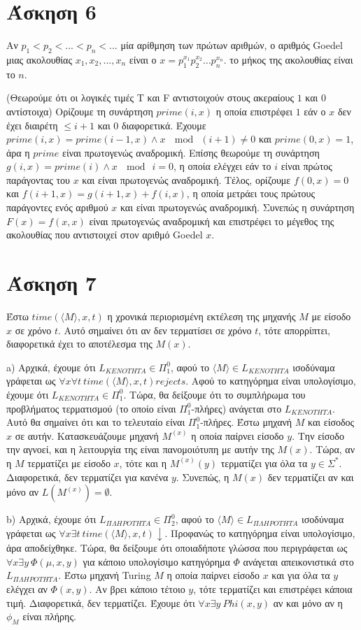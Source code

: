 \documentclass[a4paper, oneside, 11pt]{article}
\theoremstyle{definition}
\begin{document}
\section*{Άσκηση 6}
Αν $p_1<p_2<...<p_n<...$ μία αρίθμηση των πρώτων αριθμών, ο αριθμός Goedel μιας ακολουθίας $x_1,x_2,...,x_n$ είναι ο
$x = p_1^{x_1}p_2^{x_2}\dots p_n^{x_n}$. το μήκος της ακολουθίας είναι το $n$.

(Θεωρούμε ότι οι λογικές τιμές T και F αντιστοιχούν στους ακεραίους $1$ και $0$ αντίστοιχα)
Ορίζουμε τη συνάρτηση $prime(i,x)$ η οποία επιστρέφει $1$ εάν ο $x$ δεν έχει διαιρέτη $\leq i+1$ και $0$ διαφορετικά.
Έχουμε $prime(i,x)=prime(i-1,x)\land x\ \mod\ (i+1)\neq 0$ και $prime(0,x)=1$, άρα η $prime$ είναι πρωτογενώς αναδρομική.
Επίσης θεωρούμε τη συνάρτηση $g(i,x)=prime(i)\land x\ \mod\ i=0$, η οποία ελέγχει εάν το $i$ είναι πρώτος παράγοντας του $x$ και
είναι πρωτογενώς αναδρομική. Τέλος, ορίζουμε $f(0,x)=0$ και $f(i+1,x)=g(i+1,x) + f(i,x)$, η οποία μετράει τους πρώτους παράγοντες
ενός αριθμού $x$ και είναι πρωτογενώς αναδρομική. Συνεπώς η συνάρτηση $F(x)=f(x,x)$ είναι πρωτογενώς αναδρομική και επιστρέφει
το μέγεθος της ακολουθίας που αντιστοιχεί στον αριθμό Goedel $x$.

\section*{Άσκηση 7}
Έστω $time(\langle M\rangle, x, t)$ η χρονικά περιορισμένη εκτέλεση της μηχανής $M$ με είσοδο $x$ σε χρόνο $t$. Αυτό σημαίνει ότι αν δεν τερματίσει σε χρόνο $t$, τότε απορρίπτει,
διαφορετικά έχει το αποτέλεσμα της $M(x)$.

a) Αρχικά, έχουμε ότι $L_{KENOTHTA}\in \Pi_1^0$, αφού το $\langle M\rangle\in L_{KENOTHTA}$ ισοδύναμα γράφεται ως $\forall x\forall t\ time(\langle M\rangle,x,t) rejects$. 
Αφού το κατηγόρημα είναι υπολογίσιμο, έχουμε ότι $L_{KENOTHTA}\in \Pi_1^0$.
Τώρα, θα δείξουμε ότι το συμπλήρωμα του προβλήματος τερματισμού (το οποίο είναι $\Pi_1^0$-πλήρες) ανάγεται στο $L_{KENOTHTA}$. Αυτό θα σημαίνει ότι και το τελευταίο είναι 
$\Pi_1^0$-πλήρες. Έστω μηχανή $M$ και είσοδος $x$ σε αυτήν. Κατασκευάζουμε μηχανή $M^{(x)}$ η οποία παίρνει είσοδο $y$. Την είσοδο την αγνοεί, και η λειτουργία της είναι
πανομοιότυπη με αυτήν της $M(x)$. Τώρα, αν η $M$ τερματίζει με είσοδο $x$, 
τότε και η $M^{(x)}(y)$ τερματίζει για όλα τα $y\in\Sigma^*$. Διαφορετικά, δεν τερματίζει για κανένα $y$.
Συνεπώς, η $M(x)$ δεν τερματίζει αν και μόνο αν $L(M^{(x)})=\emptyset$.

b) Αρχικά, έχουμε ότι $L_{\Pi\Lambda HPOTHTA}\in \Pi_2^0$, αφού το $\langle M\rangle\in L_{\Pi\Lambda HPOTHTA}$ ισοδύναμα γράφεται ως
$\forall x\exists t\ time(\langle M\rangle, x,t)\downarrow$. Προφανώς το κατηγόρημα είναι υπολογίσιμο, άρα αποδείχθηκε.
Τώρα, θα δείξουμε ότι οποιαδήποτε γλώσσα που περιγράφεται ως $\forall x\exists y\ \Phi (\mu, x,y)$ για κάποιο υπολογίσιμο κατηγόρημα $\Phi$ ανάγεται απεικονιστικά στο
$L_{\Pi\Lambda HPOTHTA}$.
Έστω μηχανή Turing $M$ η οποία παίρνει είσοδο $x$ και για όλα τα $y$ ελέγχει αν $\Phi(x,y)$. Αν βρει κάποιο τέτοιο $y$, τότε τερματίζει και επιστρέφει κάποια τιμή.
Διαφορετικά, δεν τερματίζει. Έχουμε ότι $\forall x\exists y\ Phi(x,y)$ αν και μόνο αν η $\phi_M$ είναι πλήρης.
\end{document}
